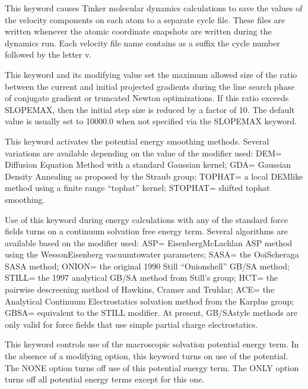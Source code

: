 \documentclass[letterpaper,11pt,english]{sphinxmanual}
\begin{document}
  This keyword causes Tinker molecular dynamics calculations to save the values of the velocity components on each atom to a separate cycle file. These files are written whenever the atomic coordinate snapshots are written during the dynamics run. Each velocity file name contains as a suffix the cycle number followed by the letter v.



  This keyword and its modifying value set the maximum allowed size of the ratio between the current and initial projected gradients during the line search phase of conjugate gradient or truncated Newton optimizations. If this ratio exceeds SLOPEMAX, then the initial step size is reduced by a factor of 10. The default value is usually set to 10000.0 when not specified via the SLOPEMAX keyword.


  This keyword activates the potential energy smoothing methods. Several variations are available depending on the value of the modifier used: DEM= Diffusion Equation Method with a standard Gaussian kernel; GDA= Gaussian Density Annealing as proposed by the Straub group; TOPHAT= a local DEM\sphinxhyphen{}like method using a finite range “tophat” kernel; STOPHAT= shifted tophat smoothing.

  Use of this keyword during energy calculations with any of the standard force fields turns on a continuum solvation free energy term. Several algorithms are available based on the modifier used: ASP= Eisenberg\sphinxhyphen{}McLachlan ASP method using the Wesson\sphinxhyphen{}Eisenberg vacuum\sphinxhyphen{}to\sphinxhyphen{}water parameters; SASA= the Ooi\sphinxhyphen{}Scheraga SASA method; ONION= the original 1990 Still “Onion\sphinxhyphen{}shell” GB/SA method; STILL= the 1997 analytical GB/SA method from Still’s group; HCT= the pairwise descreening method of Hawkins, Cramer and Truhlar; ACE= the Analytical Continuum Electrostatics solvation method from the Karplus group; GBSA= equivalent to the STILL modifier. At present, GB/SA\sphinxhyphen{}style methods are only valid for force fields that use simple partial charge electrostatics.

  This keyword controls use of the macroscopic solvation potential energy term. In the absence of a modifying option, this keyword turns on use of the potential. The NONE option turns off use of this potential energy term. The ONLY option turns off all potential energy terms except for this one.
\end{document}
